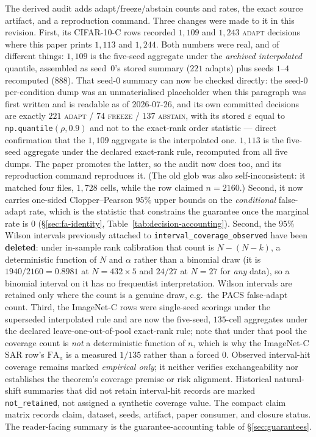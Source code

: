 The derived audit 
adds adapt/freeze/abstain counts and rates, the exact source artifact, and a reproduction command.
Three changes were made to it in this revision. First, its CIFAR-10-C rows recorded $1{,}109$ and
$1{,}243$ \textsc{adapt} decisions where this paper prints $1{,}113$ and $1{,}244$. Both numbers
were real, and of different things: $1{,}109$ is the  five-seed
aggregate under the \emph{archived interpolated} quantile, assembled as seed~$0$'s stored summary
($221$ adapts) plus seeds $1$--$4$ recomputed ($888$). That seed-$0$ summary can now be checked
directly: the seed-$0$ per-condition dump was an unmaterialised placeholder when this paragraph was
first written and is readable as of 2026-07-26, and its own committed decisions are exactly
$221$ \textsc{adapt} / $74$ \textsc{freeze} / $137$ \textsc{abstain}, with its stored
$\varepsilon$ equal to \texttt{np.quantile}$(\rho,0.9)$ and not to the exact-rank order statistic
--- direct confirmation that the $1{,}109$ aggregate is the interpolated one.
$1{,}113$ is the  five-seed aggregate under the declared
exact-rank rule, recomputed from all five dumps. The paper promotes the latter, so the audit now
does too, and its reproduction command reproduces it. (The old glob was also self-inconsistent: it
matched four files, $1{,}728$ cells, while the row claimed $n=2160$.) Second, it now carries
one-sided Clopper--Pearson
$95\%$ upper bounds on the \emph{conditional} false-adapt rate, which is the statistic that
constrains the guarantee once the marginal rate is $0$ (\S\ref{sec:fa-identity},
Table~\ref{tab:decision-accounting}). Second, the $95\%$ Wilson intervals previously attached to
\texttt{interval\_coverage\_observed} have been \textbf{deleted}: under in-sample rank calibration
that count is $N-(N-k)$, a deterministic function of $N$ and $\alpha$ rather than a binomial draw
(it is $1940/2160=0.8981$ at $N{=}432\times5$ and $24/27$ at $N{=}27$ for \emph{any} data), so a
binomial interval on it has no frequentist interpretation. Wilson intervals are retained only where
the count is a genuine draw, e.g.\ the PACS false-adapt count. Third, the ImageNet-C rows were
single-seed scorings under the superseded interpolated rule and are now the five-seed,
$135$-cell aggregates under the declared leave-one-out-of-pool exact-rank rule; note that under
that pool the coverage count is \emph{not} a deterministic function of $n$, which is why the
ImageNet-C SAR row's $\mathrm{FA}_{\mathrm u}$ is a measured $1/135$ rather than a forced $0$. Observed interval-hit coverage
remains marked \emph{empirical only}; it neither verifies exchangeability nor establishes the
theorem's coverage premise or risk alignment. Historical natural-shift summaries that did not retain interval-hit
records are marked \texttt{not\_retained}, not assigned a synthetic coverage value. The compact
claim matrix  records claim, dataset,
seeds, artifact, paper consumer, and closure status. The reader-facing summary is the
guarantee-accounting table of \S\ref{sec:guarantees}.
\fi

